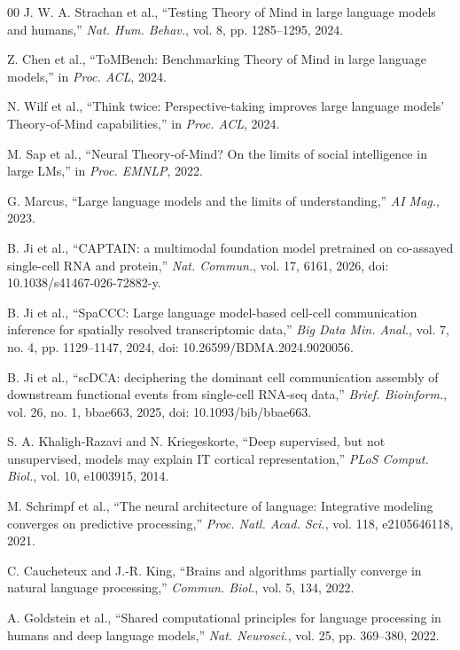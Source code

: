 \documentclass[conference]{IEEEtran}
\begin{document}
\begin{thebibliography}{00}
 J. W. A. Strachan et al., ``Testing Theory of Mind in large language models and humans,'' \textit{Nat. Hum. Behav.}, vol. 8, pp. 1285--1295, 2024.

 Z. Chen et al., ``ToMBench: Benchmarking Theory of Mind in large language models,'' in \textit{Proc. ACL}, 2024.

 N. Wilf et al., ``Think twice: Perspective-taking improves large language models' Theory-of-Mind capabilities,'' in \textit{Proc. ACL}, 2024.

 M. Sap et al., ``Neural Theory-of-Mind? On the limits of social intelligence in large LMs,'' in \textit{Proc. EMNLP}, 2022.

 G. Marcus, ``Large language models and the limits of understanding,'' \textit{AI Mag.}, 2023.

 B. Ji et al., ``CAPTAIN: a multimodal foundation model pretrained on co-assayed single-cell RNA and protein,'' \textit{Nat. Commun.}, vol. 17, 6161, 2026, doi: 10.1038/s41467-026-72882-y.

 B. Ji et al., ``SpaCCC: Large language model-based cell-cell communication inference for spatially resolved transcriptomic data,'' \textit{Big Data Min. Anal.}, vol. 7, no. 4, pp. 1129--1147, 2024, doi: 10.26599/BDMA.2024.9020056.

 B. Ji et al., ``scDCA: deciphering the dominant cell communication assembly of downstream functional events from single-cell RNA-seq data,'' \textit{Brief. Bioinform.}, vol. 26, no. 1, bbae663, 2025, doi: 10.1093/bib/bbae663.

 S. A. Khaligh-Razavi and N. Kriegeskorte, ``Deep supervised, but not unsupervised, models may explain IT cortical representation,'' \textit{PLoS Comput. Biol.}, vol. 10, e1003915, 2014.

 M. Schrimpf et al., ``The neural architecture of language: Integrative modeling converges on predictive processing,'' \textit{Proc. Natl. Acad. Sci.}, vol. 118, e2105646118, 2021.

 C. Caucheteux and J.-R. King, ``Brains and algorithms partially converge in natural language processing,'' \textit{Commun. Biol.}, vol. 5, 134, 2022.

 A. Goldstein et al., ``Shared computational principles for language processing in humans and deep language models,'' \textit{Nat. Neurosci.}, vol. 25, pp. 369--380, 2022.


\end{thebibliography}
\end{document}
